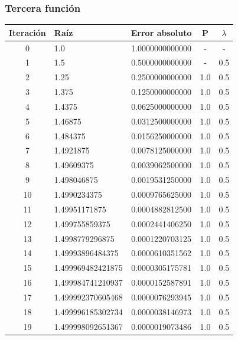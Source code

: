 \documentclass[titlepage,a4paper]{article}
\begin{document}
\subsubsection{Tercera función}\label{sec:bis3}
\begin{center}
    \begin{tabular}{| c | l | c | c | c |}
        \hline
            Iteración & Raíz & Error absoluto & P & $\lambda$ \\ \hline
        0      & 1.0  &  1.0000000000000  &  -  &  - \\
        1      & 1.5  &  0.5000000000000  &  -  &  0.5 \\
        2      & 1.25  &  0.2500000000000  &  1.0  &  0.5 \\
        3      & 1.375  &  0.1250000000000  &  1.0  &  0.5 \\
        4      & 1.4375  &  0.0625000000000  &  1.0  &  0.5 \\
        5      & 1.46875  &  0.0312500000000  &  1.0  &  0.5 \\
        6      & 1.484375  &  0.0156250000000  &  1.0  &  0.5 \\
        7      & 1.4921875  &  0.0078125000000  &  1.0  &  0.5 \\
        8      & 1.49609375  &  0.0039062500000  &  1.0  &  0.5 \\
        9      & 1.498046875  &  0.0019531250000  &  1.0  &  0.5 \\
        10      & 1.4990234375  &  0.0009765625000  &  1.0  &  0.5 \\
        11      & 1.49951171875  &  0.0004882812500  &  1.0  &  0.5 \\
        12      & 1.499755859375  &  0.0002441406250  &  1.0  &  0.5 \\
        13      & 1.4998779296875  &  0.0001220703125  &  1.0  &  0.5 \\
        14      & 1.49993896484375  &  0.0000610351562  &  1.0  &  0.5 \\
        15      & 1.499969482421875  &  0.0000305175781  &  1.0  &  0.5 \\
        16      & 1.499984741210937  &  0.0000152587891  &  1.0  &  0.5 \\
        17      & 1.499992370605468  &  0.0000076293945  &  1.0  &  0.5 \\
        18      & 1.499996185302734  &  0.0000038146973  &  1.0  &  0.5 \\
        19      & 1.499998092651367  &  0.0000019073486  &  1.0  &  0.5 \\

\end{tabular}
\end{center}
\end{document}
